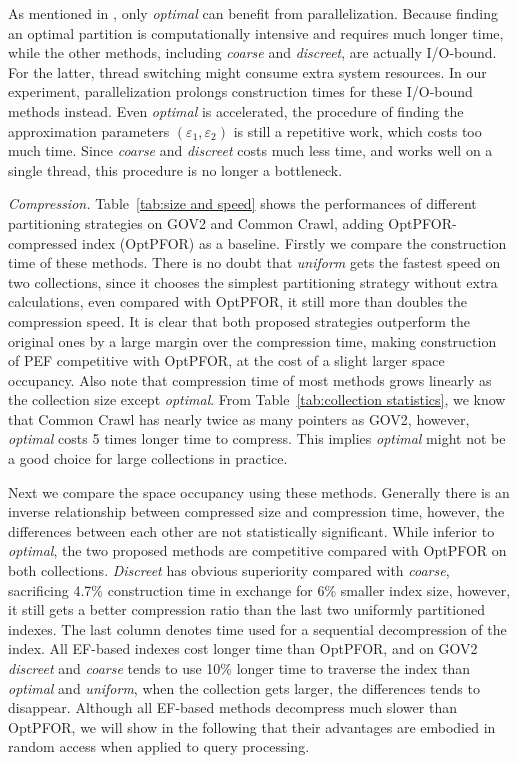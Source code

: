 \documentclass[runningheads]{comsis2}
\begin{document}
As mentioned in \cite{ottaviano2014partitioned}, only \textit{optimal} can benefit from parallelization.
Because finding an optimal partition is computationally intensive and requires much longer time, while the other methods, including \textit{coarse} and \textit{discreet}, are actually I/O-bound.
For the latter, thread switching might consume extra system resources.
In our experiment, parallelization prolongs construction times for these I/O-bound methods instead.
Even \textit{optimal} is accelerated, the procedure of finding the approximation parameters $ \left( \varepsilon_1, \varepsilon_2 \right) $ is still a repetitive work, which costs too much time.
Since \textit{coarse} and \textit{discreet} costs much less time, and works well on a single thread, this procedure is no longer a bottleneck.

\textit{Compression.} Table~\ref{tab:size and speed} shows the performances of different partitioning strategies on GOV2 and Common Crawl, adding OptPFOR-compressed index (OptPFOR) as a baseline.
Firstly we compare the construction time of these methods.
There is no doubt that \textit{uniform} gets the fastest speed on two collections, since it chooses the simplest partitioning strategy without extra calculations, even compared with OptPFOR, it still more than doubles the compression speed.
It is clear that both proposed strategies outperform the original ones by a large margin over the compression time, making construction of PEF competitive with OptPFOR, at the cost of a slight larger space occupancy.
Also note that compression time of most methods grows linearly as the collection size except \textit{optimal}.
From Table~\ref{tab:collection statistics}, we know that Common Crawl has nearly twice as many pointers as GOV2, however, \textit{optimal} costs 5 times longer time to compress.
This implies \textit{optimal} might not be a good choice for large collections in practice.

Next we compare the space occupancy using these methods.
Generally there is an inverse relationship between compressed size and compression time, however, the differences between each other are not statistically significant.
While inferior to \textit{optimal}, the two proposed methods are competitive compared with OptPFOR on both collections.
\textit{Discreet} has obvious superiority compared with \textit{coarse}, sacrificing 4.7\% construction time in exchange for 6\% smaller index size, however, it still gets a better compression ratio than the last two uniformly partitioned indexes.
The last column denotes time used for a sequential decompression of the index.
All EF-based indexes cost longer time than OptPFOR, and on GOV2 \textit{discreet} and \textit{coarse} tends to use 10\% longer time to traverse the index than \textit{optimal} and \textit{uniform}, when the collection gets larger, the differences tends to disappear.
Although all EF-based methods decompress much slower than OptPFOR, we will show in the following that their advantages are embodied in random access when applied to query processing.
\end{document}
